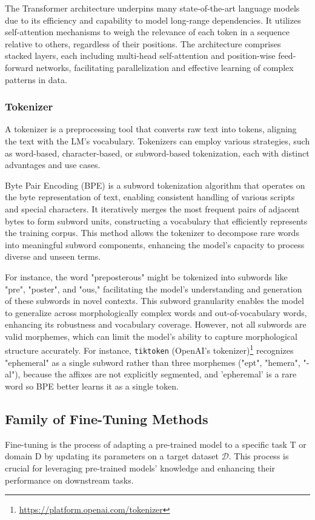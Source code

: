 The Transformer architecture underpins many state-of-the-art language models due to its efficiency and capability to model long-range dependencies. It utilizes self-attention mechanisms to weigh the relevance of each token in a sequence relative to others, regardless of their positions. The architecture comprises stacked layers, each including multi-head self-attention and position-wise feed-forward networks, facilitating parallelization and effective learning of complex patterns in data.

\subsubsection{Tokenizer} \label{app:tokenizer}

A tokenizer is a preprocessing tool that converts raw text into tokens, aligning the text with the LM's vocabulary. Tokenizers can employ various strategies, such as word-based, character-based, or subword-based tokenization, each with distinct advantages and use cases.

Byte Pair Encoding (BPE) is a subword tokenization algorithm that operates on the byte representation of text, enabling consistent handling of various scripts and special characters. It iteratively merges the most frequent pairs of adjacent bytes to form subword units, constructing a vocabulary that efficiently represents the training corpus. This method allows the tokenizer to decompose rare words into meaningful subword components, enhancing the model's capacity to process diverse and unseen terms.

For instance, the word "preposterous" might be tokenized into subwords like "pre", "poster", and "ous," facilitating the model's understanding and generation of these subwords in novel contexts. This subword granularity enables the model to generalize across morphologically complex words and out-of-vocabulary words, enhancing its robustness and vocabulary coverage. However, not all subwords are valid morphemes, which can limit the model's ability to capture morphological structure accurately. For instance, \texttt{tiktoken} (OpenAI's tokenizer)\footnote{\href{https://platform.openai.com/tokenizer}{https://platform.openai.com/tokenizer}} recognizes "ephemeral" as a single subword rather than three morphemes ("ept", "hemera", "-al"), because the affixes are not explicitly segmented, and 'epheremal' is a rare word so BPE better learns it as a single token.

\subsection{Family of Fine-Tuning Methods} \label{app:finetuning}
Fine-tuning is the process of adapting a pre-trained model to a specific task T or domain D by updating its parameters on a target dataset \(\mathcal{D}\). This process is crucial for leveraging pre-trained models' knowledge and enhancing their performance on downstream tasks.

